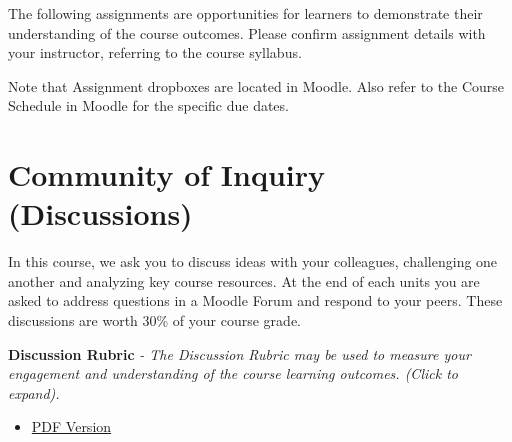 \documentclass[
]{book}
\providecommand{\tightlist}{%
  \setlength{\itemsep}{0pt}\setlength{\parskip}{0pt}}
\begin{document}
The following assignments are opportunities for learners to demonstrate their understanding of the course outcomes. Please confirm assignment details with your instructor, referring to the course syllabus.

Note that Assignment dropboxes are located in Moodle. Also refer to the Course Schedule in Moodle for the specific due dates.

\hypertarget{community-of-inquiry-discussions}{%
\section*{Community of Inquiry (Discussions)}\label{community-of-inquiry-discussions}}

\begin{assessment}
In this course, we ask you to discuss ideas with your colleagues,
challenging one another and analyzing key course resources. At the end
of each units you are asked to address questions in a Moodle Forum and
respond to your peers. These discussions are worth 30\% of your course
grade.
\end{assessment}

\textbf{Discussion Rubric} \emph{- The Discussion Rubric may be used to measure your engagement and understanding of the course learning outcomes. (Click to expand).}

\begin{itemize}
\tightlist
\item
  \href{assets/assessment/LDRS664_DiscussionRubric.pdf}{PDF Version}
\end{itemize}
\end{document}
